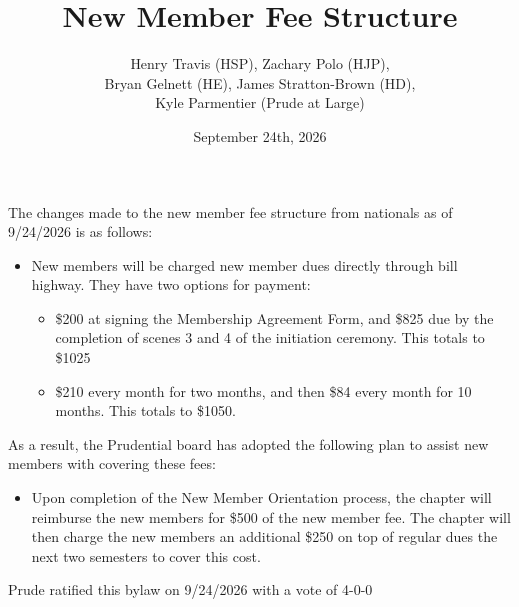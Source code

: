 \documentclass{article}
\title{New Member Fee Structure}
\author{Henry Travis (HSP), Zachary Polo (HJP), \\Bryan Gelnett (HE), James Stratton-Brown (HD), \\Kyle Parmentier (Prude at Large)}
\date{September 24th, 2026}
\begin{document}
	
	\maketitle
	
	The changes made to the new member fee structure from nationals as of 9/24/2026 is as follows:
	
	\begin{itemize}
		\item New members will be charged new member dues directly through bill highway. They have two options for payment:
		\begin{itemize}
			\item \$200 at signing the Membership Agreement Form, and \$825 due by the completion of scenes 3 and 4 of the initiation ceremony. This totals to \$1025
			\item \$210 every month for two months, and then \$84 every month for 10 months. This totals to \$1050.
		\end{itemize}
	\end{itemize}
	
	As a result, the Prudential board has adopted the following plan to assist new members with covering these fees:
	
	\begin{itemize}
		\item Upon completion of the New Member Orientation process, the chapter will reimburse the new members for \$500 of the new member fee. The chapter will then charge the new members an additional \$250 on top of regular dues the next two semesters to cover this cost.
	\end{itemize}
	
	Prude ratified this bylaw on 9/24/2026 with a vote of 4-0-0
\end{document}
